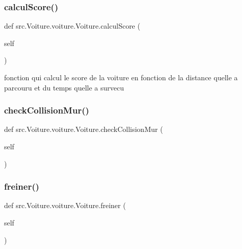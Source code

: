 \subsubsection{\texorpdfstring{calcul\+Score()}{calculScore()}}
{\footnotesize\ttfamily def src.\+Voiture.\+voiture.\+Voiture.\+calcul\+Score (\begin{DoxyParamCaption}\item[{}]{self }\end{DoxyParamCaption})}



fonction qui calcul le score de la voiture en fonction de la distance qu\textquotesingle{}elle a parcouru et du temps qu\textquotesingle{}elle a survecu 

\mbox{\label{classsrc_1_1_voiture_1_1voiture_1_1_voiture_aedd6fbfe283ac4e8dbc80ae1ff5aeeb9}} 
\subsubsection{\texorpdfstring{check\+Collision\+Mur()}{checkCollisionMur()}}
{\footnotesize\ttfamily def src.\+Voiture.\+voiture.\+Voiture.\+check\+Collision\+Mur (\begin{DoxyParamCaption}\item[{}]{self }\end{DoxyParamCaption})}

\mbox{\label{classsrc_1_1_voiture_1_1voiture_1_1_voiture_af163e07ac6317ff655531984a56b0f26}} 
\subsubsection{\texorpdfstring{freiner()}{freiner()}}
{\footnotesize\ttfamily def src.\+Voiture.\+voiture.\+Voiture.\+freiner (\begin{DoxyParamCaption}\item[{}]{self }\end{DoxyParamCaption})}



